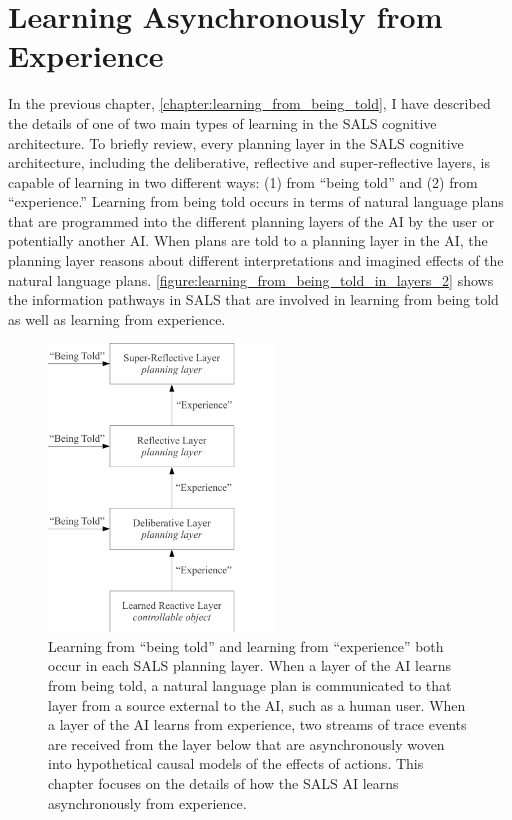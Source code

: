 \chapter{Learning Asynchronously from Experience}
\label{chapter:learning_asynchronously_from_experience}

In the previous chapter,
{\mbox{\autoref{chapter:learning_from_being_told}}},
I have described the details of one of two main types of learning in
the SALS cognitive architecture.  To briefly review, every planning
layer in the SALS cognitive architecture, including the deliberative,
reflective and super-reflective layers, is capable of learning in two
different ways: (1) from ``being told'' and (2) from ``experience.''
Learning from being told occurs in terms of natural language plans
that are programmed into the different planning layers of the AI by
the user or potentially another AI.  When plans are told to a planning
layer in the AI, the planning layer reasons about different
interpretations and imagined effects of the natural language plans.
{\mbox{\autoref{figure:learning_from_being_told_in_layers_2}}} shows
the information pathways in SALS that are involved in learning from
being told as well as learning from experience.
\begin{figure}
\centering
\includegraphics[width=6cm]{gfx/learning_from_being_told_in_layers}
\caption[Learning from ``being told'' and learning from ``experience''
  both occur in each SALS planning layer.]{Learning from ``being
  told'' and learning from ``experience'' both occur in each SALS
  planning layer.  When a layer of the AI learns from being told, a
  natural language plan is communicated to that layer from a source
  external to the AI, such as a human user.  When a layer of the AI
  learns from experience, two streams of trace events are received
  from the layer below that are asynchronously woven into hypothetical
  causal models of the effects of actions.  This chapter focuses on
  the details of how the SALS AI learns asynchronously from
  experience.}
\label{figure:learning_from_being_told_in_layers_2}
\end{figure}
